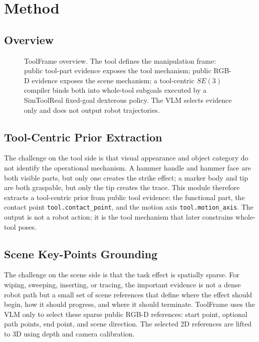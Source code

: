 \documentclass[journal]{IEEEtran}
\newcommand{\method}{ToolFrame}
\begin{document}
\section{Method}
\subsection{Overview}
\begin{figure}[t]
\centering
{}
\caption{\method{} overview. The tool defines the manipulation frame: public
tool-part evidence exposes the tool mechanism; public RGB-D evidence exposes
the scene mechanism; a tool-centric $SE(3)$ compiler binds both into whole-tool
subgoals executed by a SimToolReal fixed-goal dexterous policy. The VLM selects
evidence only and does not output robot trajectories.}
\label{fig:overview}
\end{figure}

\subsection{Tool-Centric Prior Extraction}
The challenge on the tool side is that visual appearance and object category do
not identify the operational mechanism. A hammer handle and hammer face are
both visible parts, but only one creates the strike effect; a marker body and
tip are both graspable, but only the tip creates the trace. This module
therefore extracts a tool-centric prior from public tool evidence: the
functional part, the contact point \texttt{tool.contact\_point}, and the
motion axis \texttt{tool.motion\_axis}. The output is not a robot action; it
is the tool mechanism that later constrains whole-tool poses.

\subsection{Scene Key-Points Grounding}
The challenge on the scene side is that the task effect is spatially sparse.
For wiping, sweeping, inserting, or tracing, the important evidence is not a
dense robot path but a small set of scene references that define where the
effect should begin, how it should progress, and where it should terminate.
\method{} uses the VLM only to select these sparse public RGB-D references:
start point, optional path points, end point, and scene direction. The selected
2D references are lifted to 3D using depth and camera calibration.
\end{document}
